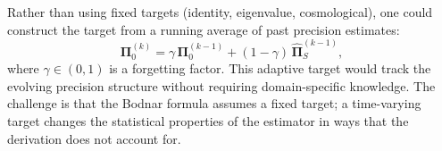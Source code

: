 Rather than using fixed targets (identity, eigenvalue, cosmological), one could construct the target from a running average of past precision estimates:
\begin{equation*}
\boldsymbol{\Pi}_0^{(k)} = \gamma \, \boldsymbol{\Pi}_0^{(k-1)} + (1 - \gamma) \, \hat{\boldsymbol{\Pi}}_S^{(k-1)},
\end{equation*}
where $\gamma \in (0, 1)$ is a forgetting factor. This adaptive target would track the evolving precision structure without requiring domain-specific knowledge. The challenge is that the Bodnar formula assumes a fixed target; a time-varying target changes the statistical properties of the estimator in ways that the derivation does not account for.
